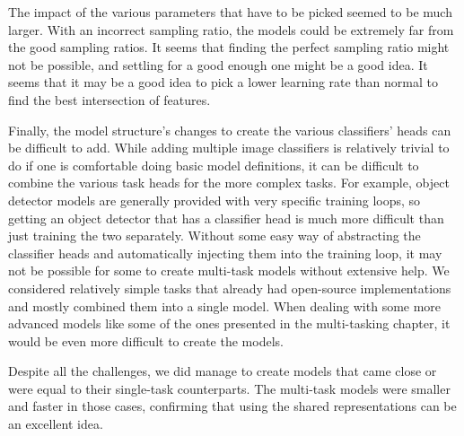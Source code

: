 The impact of the various parameters that have to be picked seemed to be much larger.
With an incorrect sampling ratio, the models could be extremely far from the good sampling ratios.
It seems that finding the perfect sampling ratio might not be possible, and settling for a good enough one might be a good idea.
It seems that it may be a good idea to pick a lower learning rate than normal to find the best intersection of features.

Finally, the model structure's changes to create the various classifiers' heads can be difficult to add.
While adding multiple image classifiers is relatively trivial to do if one is comfortable doing basic model definitions, it can be difficult to combine the various task heads for the more complex tasks.
For example, object detector models are generally provided with very specific training loops, so getting an object detector that has a classifier head is much more difficult than just training the two separately.
Without some easy way of abstracting the classifier heads and automatically injecting them into the training loop, it may not be possible for some to create multi-task models without extensive help.
We considered relatively simple tasks that already had open-source implementations and mostly combined them into a single model.
When dealing with some more advanced models like some of the ones presented in the multi-tasking chapter, it would be even more difficult to create the models.

Despite all the challenges, we did manage to create models that came close or were equal to their single-task counterparts.
The multi-task models were smaller and faster in those cases, confirming that using the shared representations can be an excellent idea.